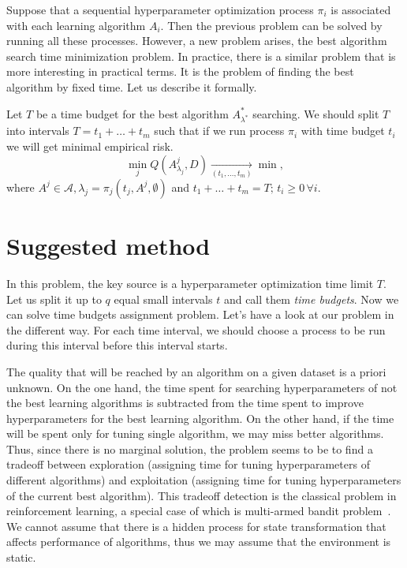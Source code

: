 \documentclass{svproc}
\begin{document}
Suppose that a sequential hyperparameter optimization process $\pi_i$ is associated with each learning algorithm $A_i.$ Then the previous problem can be solved by running all these processes. However, a new problem arises, the best algorithm search time minimization problem. In practice, there is a similar problem that is more interesting in practical terms. It is the problem of finding the best algorithm by fixed time. Let us describe it formally.

Let $T$ be a time budget for the best algorithm $A^*_{\lambda^*}$ searching. We should split $T$ into intervals $T = t_1 + \dots + t_m$ such that if we run process $\pi_i$ with time budget $t_i$ we will get minimal empirical risk.
\[
\min_{j} Q(A_{\lambda_j}^j, D)\xrightarrow
[\left(t_1, \ldots, t_m\right)]{} \min,
\]
where $A^j \in \mathscr{A}, \lambda_j=\pi_j(t_j, A^j, \emptyset)$ and ${t_1+\ldots+t_m=T;\, t_i\ge 0\, \forall i}.$


\section{Suggested method}
\label{sec:suggest}

In this problem, the key source is a hyperparameter optimization time limit $T$. Let us split it up to $q$ equal small intervals $t$ and call them \emph{time budgets}. Now we can solve time budgets assignment problem. Let’s have a look at our problem in the different way. For each time interval, we should choose a process to be run during this interval before this interval starts.

The quality that will be reached by an algorithm on a given dataset is a priori unknown. On the one hand, the time spent for searching hyperparameters of not the best learning algorithms is subtracted from the time spent to improve hyperparameters for the best learning algorithm. On the other hand, if the time will be spent only for tuning single algorithm, we may miss better algorithms. Thus, since there is no marginal solution, the problem seems to be to find a tradeoff between exploration (assigning time for tuning hyperparameters of different algorithms) and exploitation (assigning time for tuning hyperparameters of the current best algorithm). This tradeoff detection is the classical problem in reinforcement learning, a special case of which is multi-armed bandit problem~\cite{reinfl}. We cannot assume that there is a hidden process for state transformation that affects performance of algorithms, thus we may assume that the environment is static.   
\end{document}
